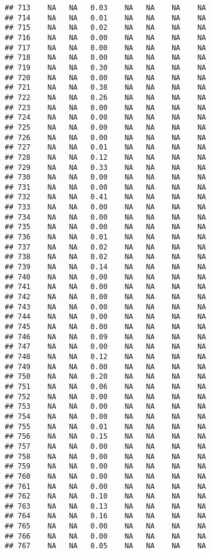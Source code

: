 \documentclass{article}\usepackage{graphicx, color}
\makeatletter
\newenvironment{kframe}{%
 \def\at@end@of@kframe{}%
 \ifinner\ifhmode%
  \def\at@end@of@kframe{\end{minipage}}%
  \begin{minipage}{\columnwidth}%
 \fi\fi%
 \def\FrameCommand##1{\hskip\@totalleftmargin \hskip-\fboxsep
 \colorbox{shadecolor}{##1}\hskip-\fboxsep
     \hskip-\linewidth \hskip-\@totalleftmargin \hskip\columnwidth}%
 \MakeFramed {\advance\hsize-\width
   \@totalleftmargin\z@ \linewidth\hsize
   \@setminipage}}%
 {\par\unskip\endMakeFramed%
 \at@end@of@kframe}
\newenvironment{knitrout}{}{} %
\makeatother
\begin{document}
\begin{knitrout}
\begin{kframe}
\begin{verbatim}
## 713    NA   NA   0.03    NA   NA    NA    NA
## 714    NA   NA   0.01    NA   NA    NA    NA
## 715    NA   NA   0.02    NA   NA    NA    NA
## 716    NA   NA   0.00    NA   NA    NA    NA
## 717    NA   NA   0.00    NA   NA    NA    NA
## 718    NA   NA   0.00    NA   NA    NA    NA
## 719    NA   NA   0.30    NA   NA    NA    NA
## 720    NA   NA   0.00    NA   NA    NA    NA
## 721    NA   NA   0.38    NA   NA    NA    NA
## 722    NA   NA   0.26    NA   NA    NA    NA
## 723    NA   NA   0.00    NA   NA    NA    NA
## 724    NA   NA   0.00    NA   NA    NA    NA
## 725    NA   NA   0.00    NA   NA    NA    NA
## 726    NA   NA   0.00    NA   NA    NA    NA
## 727    NA   NA   0.01    NA   NA    NA    NA
## 728    NA   NA   0.12    NA   NA    NA    NA
## 729    NA   NA   0.33    NA   NA    NA    NA
## 730    NA   NA   0.00    NA   NA    NA    NA
## 731    NA   NA   0.00    NA   NA    NA    NA
## 732    NA   NA   0.41    NA   NA    NA    NA
## 733    NA   NA   0.00    NA   NA    NA    NA
## 734    NA   NA   0.00    NA   NA    NA    NA
## 735    NA   NA   0.00    NA   NA    NA    NA
## 736    NA   NA   0.01    NA   NA    NA    NA
## 737    NA   NA   0.02    NA   NA    NA    NA
## 738    NA   NA   0.02    NA   NA    NA    NA
## 739    NA   NA   0.14    NA   NA    NA    NA
## 740    NA   NA   0.00    NA   NA    NA    NA
## 741    NA   NA   0.00    NA   NA    NA    NA
## 742    NA   NA   0.00    NA   NA    NA    NA
## 743    NA   NA   0.00    NA   NA    NA    NA
## 744    NA   NA   0.00    NA   NA    NA    NA
## 745    NA   NA   0.00    NA   NA    NA    NA
## 746    NA   NA   0.09    NA   NA    NA    NA
## 747    NA   NA   0.00    NA   NA    NA    NA
## 748    NA   NA   0.12    NA   NA    NA    NA
## 749    NA   NA   0.00    NA   NA    NA    NA
## 750    NA   NA   0.20    NA   NA    NA    NA
## 751    NA   NA   0.06    NA   NA    NA    NA
## 752    NA   NA   0.00    NA   NA    NA    NA
## 753    NA   NA   0.00    NA   NA    NA    NA
## 754    NA   NA   0.00    NA   NA    NA    NA
## 755    NA   NA   0.01    NA   NA    NA    NA
## 756    NA   NA   0.15    NA   NA    NA    NA
## 757    NA   NA   0.00    NA   NA    NA    NA
## 758    NA   NA   0.00    NA   NA    NA    NA
## 759    NA   NA   0.00    NA   NA    NA    NA
## 760    NA   NA   0.00    NA   NA    NA    NA
## 761    NA   NA   0.00    NA   NA    NA    NA
## 762    NA   NA   0.10    NA   NA    NA    NA
## 763    NA   NA   0.13    NA   NA    NA    NA
## 764    NA   NA   0.16    NA   NA    NA    NA
## 765    NA   NA   0.00    NA   NA    NA    NA
## 766    NA   NA   0.00    NA   NA    NA    NA
## 767    NA   NA   0.05    NA   NA    NA    NA

\end{verbatim}
\end{kframe}
\end{knitrout}
\end{document}
